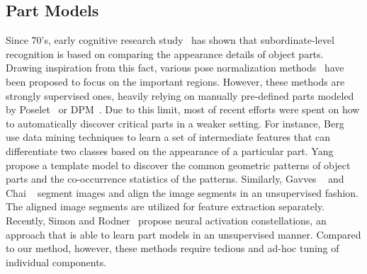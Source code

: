 \documentclass[10pt,twocolumn,letterpaper]{article}
\begin{document}
\subsection{Part Models}
Since 70's, early cognitive research study~\cite{rosch1976basic} has shown that subordinate-level recognition is based on comparing the appearance details of object parts.
Drawing inspiration from this fact, various pose normalization methods~\cite{farrell2011birdlets, zhang2013deformable, zhang2014panda, liu2012dog, zhang2014part} have been proposed to focus on the important regions.
However, these methods are strongly supervised ones, heavily relying on manually pre-defined parts modeled by Poselet~\cite{bourdev2009poselets} or DPM~\cite{felzenszwalb2010object}.
Due to this limit, most of recent efforts were spent on how to automatically discover critical parts in a weaker setting.
For instance, Berg \etal~\cite{berg2013poof} use data mining techniques to learn a set of intermediate features that can differentiate two classes based on the appearance of a particular part.
Yang \etal~\cite{yang2012unsupervised} propose a template model to discover the common geometric patterns of object parts and the co-occurrence statistics of the patterns.
Similarly, Gavves \etal~\cite{gavves2013fine} and Chai \etal~\cite{chai2011bicos} segment images and align the image segments in an unsupervised fashion.
The aligned image segments are utilized for feature extraction separately.
Recently, Simon and Rodner~\cite{simon2015neural} propose neural activation constellations, an approach that is able to learn part models in an unsupervised manner.
Compared to our method, however, these methods require tedious and ad-hoc tuning of individual components.


\end{document}
